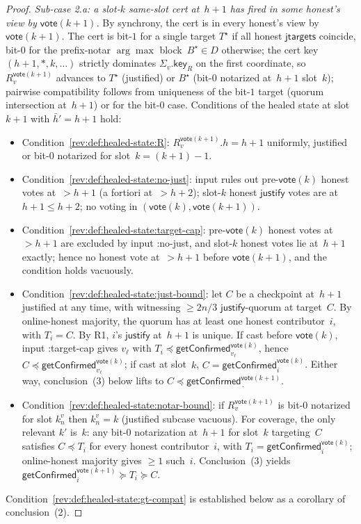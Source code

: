 \ifx\litemode\undefined\documentclass{article}\fi
\newcommand{\just}{\ensuremath{\mathsf{justify}}\xspace}
\newcommand{\jtargets}{\mathsf{jtargets}}
\newcommand{\key}{\mathsf{key}}
\newcommand{\vote}{\mathsf{vote}}
\newcommand{\comm}[1]{\bar{#1}}
\newcommand{\getConfirmed}{\textsf{getConfirmed}\xspace}
\theoremstyle{plain}
\theoremstyle{definition}
\theoremstyle{remark}
\newcommand{\OHM}{online-honest majority\xspace}
\begin{document}
\begin{proof}
\emph{Sub-case 2.a: a slot-$k$ same-slot cert at~$h+1$ has fired in some honest's view by $\vote(k+1)$.}
By synchrony, the cert is in every honest's view by $\vote(k+1)$. The cert is bit-$1$ for a single target $T^\star$ if all honest $\jtargets$ coincide, bit-$0$ for the prefix-notar $\arg\max$ block~$B^\star \in D$ otherwise; the cert key $(h+1, \ast, k, \ldots)$ strictly dominates $\Sigma_v.\key_R$ on the first coordinate, so $R_v^{\vote(k+1)}$ advances to $T^\star$ (justified) or $B^\star$ (bit-$0$ notarized at~$h+1$ slot~$k$); pairwise compatibility follows from uniqueness of the bit-$1$ target (quorum intersection at~$h+1$) or  for the bit-$0$ case. Conditions of the healed state at slot~$k+1$ with $\comm{h}' = h+1$ hold:
\begin{itemize}
  \item Condition~\ref{rev:def:healed-state:R}: $R_v^{\vote(k+1)}.h = h+1$ uniformly, justified or bit-$0$ notarized for slot~$k = (k+1)-1$.
  \item Condition~\ref{rev:def:healed-state:no-just}: input rules out pre-$\vote(k)$ honest votes at~$>h+1$ (a fortiori at~$>h+2$); slot-$k$ honest \just votes are at~$h+1 \leq h+2$; no voting in $(\vote(k),\vote(k+1))$.
  \item Condition~\ref{rev:def:healed-state:target-cap}: pre-$\vote(k)$ honest votes at~$>h+1$ are excluded by input :no-just, and slot-$k$ honest votes lie at~$h+1$ exactly; hence no honest vote at~$>h+1$ before $\vote(k+1)$, and the condition holds vacuously.
  \item Condition~\ref{rev:def:healed-state:just-bound}: let $C$ be a checkpoint at~$h+1$ justified at any time, with witnessing $\geq 2n/3$ \just-quorum at target~$C$. By \OHM, the quorum has at least one honest contributor~$i$, with $T_i = C$. By R1, $i$'s \just at~$h+1$ is unique. If cast before $\vote(k)$, input :target-cap gives $v_\ell$ with $T_i \preceq \getConfirmed_{v_\ell}^{\vote(k)}$, hence $C \preceq \getConfirmed_{v_\ell}^{\vote(k)}$; if cast at slot~$k$, $C = \getConfirmed_i^{\vote(k)}$. Either way, conclusion~(3) below lifts to $C \preceq \getConfirmed_{\,\cdot\,}^{\vote(k+1)}$.
  \item Condition~\ref{rev:def:healed-state:notar-bound}: if $R_v^{\vote(k+1)}$ is bit-$0$ notarized for slot $k_n^v$ then $k_n^v = k$ (justified subcase vacuous). For coverage, the only relevant $k'$ is~$k$: any bit-$0$ notarization at~$h+1$ for slot~$k$ targeting~$C$ satisfies $C \preceq T_i$ for every honest contributor~$i$, with $T_i = \getConfirmed_i^{\vote(k)}$; \OHM gives $\geq 1$ such~$i$. Conclusion~(3) yields $\getConfirmed_i^{\vote(k+1)} \succeq T_i \succeq C$.
\end{itemize}
Condition~\ref{rev:def:healed-state:gt-compat} is established below as a corollary of conclusion~(2).


\end{proof}
\end{document}
